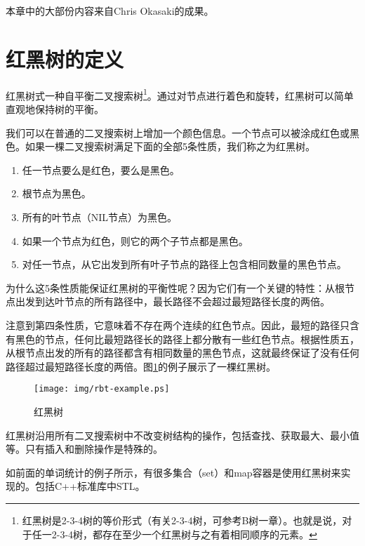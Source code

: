 \documentclass[UTF8]{article}
\begin{document}
本章中的大部份内容来自Chris Okasaki的成果\cite{okasaki}。

\section{红黑树的定义}

红黑树式一种自平衡二叉搜索树\cite{wiki}\footnote{红黑树是2-3-4树的等价形式（有关2-3-4树，可参考B树一章）。也就是说，对于任一2-3-4树，都存在至少一个红黑树与之有着相同顺序的元素。}。通过对节点进行着色和旋转，红黑树可以简单直观地保持树的平衡。

我们可以在普通的二叉搜索树上增加一个颜色信息。一个节点可以被涂成红色或黑色。如果一棵二叉搜索树满足下面的全部5条性质，我们称之为红黑树\cite{CLRS}。

\begin{enumerate}
\item 任一节点要么是红色，要么是黑色。
\item 根节点为黑色。
\item 所有的叶节点（NIL节点）为黑色。
\item 如果一个节点为红色，则它的两个子节点都是黑色。
\item 对任一节点，从它出发到所有叶子节点的路径上包含相同数量的黑色节点。
\end{enumerate}

为什么这5条性质能保证红黑树的平衡性呢？因为它们有一个关键的特性：从根节点出发到达叶节点的所有路径中，最长路径不会超过最短路径长度的两倍。

注意到第四条性质，它意味着不存在两个连续的红色节点。因此，最短的路径只含有黑色的节点，任何比最短路径长的路径上都分散有一些红色节点。根据性质五，从根节点出发的所有的路径都含有相同数量的黑色节点，这就最终保证了没有任何路径超过最短路径长度的两倍\cite{wiki}。图\ref{fig:rbt-example}的例子展示了一棵红黑树。

\begin{figure}[htbp]
  \centering
  \texttt{[image: img/rbt-example.ps]}
  \caption{红黑树} \label{fig:rbt-example}
\end{figure}

红黑树沿用所有二叉搜索树中不改变树结构的操作，包括查找、获取最大、最小值等。只有插入和删除操作是特殊的。

如前面的单词统计的例子所示，有很多集合（set）和map容器是使用红黑树来实现的。包括C++标准库中STL\cite{sgi-stl}。
\end{document}

